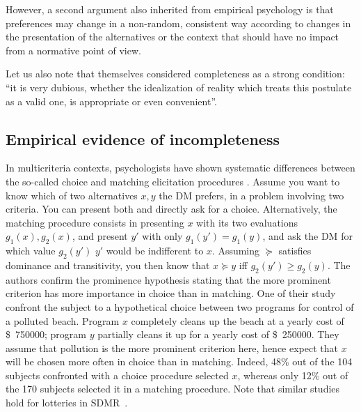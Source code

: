 \documentclass[french, english]{llncs}
\newcommand{\dollars}[1]{\SI{#1}[\$]{}}
\begin{document}
	However, a second argument also inherited from empirical psychology is that preferences may change in a non-random, consistent way according to changes in the presentation of the alternatives or the context that should have no impact from a normative point of view. 
	
	
	Let us also note that \citet[p. 630]{von_neumann_theory_2004} themselves considered completeness as a strong condition: “it is very dubious, whether the idealization of reality which treats this postulate as a valid one, is appropriate or even convenient”.

	\subsection{Empirical evidence of incompleteness}
	
	In multicriteria contexts, psychologists have shown systematic differences between the so-called choice and matching elicitation procedures \citep{tversky_contingent_1988}. Assume you want to know which of two alternatives $x, y$ the \ac{DM} prefers, in a problem involving two criteria. You can present both and directly ask for a choice. Alternatively, the matching procedure consists in presenting $x$ with its two evaluations $g_1(x), g_2(x)$, and present $y'$ with only $g_1(y') = g_1(y)$, and ask the \ac{DM} for which value $g_2(y')$ $y'$ would be indifferent to $x$. Assuming $\succeq$ satisfies dominance and transitivity, you then know that $x \succeq y$ iff $g_2(y') ≥ g_2(y)$. The authors confirm the prominence hypothesis stating that the more prominent criterion has more importance in choice than in matching. One of their study confront the subject to a hypothetical choice between two programs for control of a polluted beach. Program $x$ completely cleans up the beach at a yearly cost of \dollars{750 000}; program $y$ partially cleans it up for a yearly cost of \dollars{250 000}. They assume that pollution is the more prominent criterion here, hence expect that $x$ will be chosen more often in choice than in matching. Indeed, 48\% out of the 104 subjects confronted with a choice procedure selected $x$, whereas only 12\% out of the 170 subjects selected it in a matching procedure. Note that similar studies hold for lotteries in SDMR~\citep{luce_utility_2000}.
	
\end{document}
